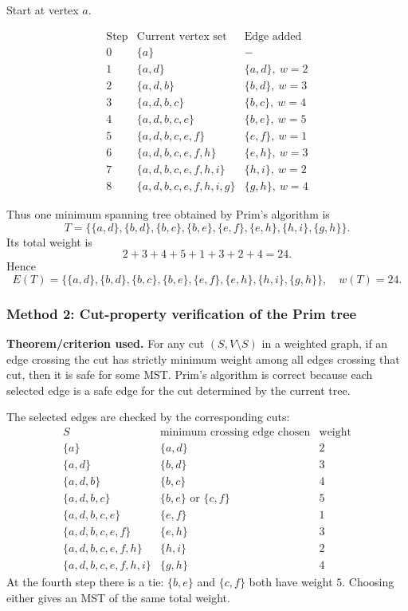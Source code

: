 \documentclass[12pt]{article}
\begin{document}
Start at vertex $a$.

\[
\begin{array}{c|c|c}
\text{Step} & \text{Current vertex set} & \text{Edge added} \\ \hline
0 & \{a\} & -\\
1 & \{a,d\} & \{a,d\},\ w=2\\
2 & \{a,d,b\} & \{b,d\},\ w=3\\
3 & \{a,d,b,c\} & \{b,c\},\ w=4\\
4 & \{a,d,b,c,e\} & \{b,e\},\ w=5\\
5 & \{a,d,b,c,e,f\} & \{e,f\},\ w=1\\
6 & \{a,d,b,c,e,f,h\} & \{e,h\},\ w=3\\
7 & \{a,d,b,c,e,f,h,i\} & \{h,i\},\ w=2\\
8 & \{a,d,b,c,e,f,h,i,g\} & \{g,h\},\ w=4
\end{array}
\]

Thus one minimum spanning tree obtained by Prim's algorithm is
\[
  T=\bigl\{
  \{a,d\},\{b,d\},\{b,c\},\{b,e\},
  \{e,f\},\{e,h\},\{h,i\},\{g,h\}
  \bigr\}.
\]
Its total weight is
\[
  2+3+4+5+1+3+2+4=24.
\]
Hence
\[
  \boxed{
  E(T)=\{\{a,d\},\{b,d\},\{b,c\},\{b,e\},\{e,f\},\{e,h\},\{h,i\},\{g,h\}\},
  \quad w(T)=24.}
\]

\subsubsection{Method 2: Cut-property verification of the Prim tree}
\textbf{Theorem/criterion used.} For any cut $(S,V\setminus S)$ in a weighted graph, if an edge crossing the cut has strictly minimum weight among all edges crossing that cut, then it is safe for some MST. Prim's algorithm is correct because each selected edge is a safe edge for the cut determined by the current tree.

The selected edges are checked by the corresponding cuts:
\[
\begin{array}{c|c|c}
S & \text{minimum crossing edge chosen} & \text{weight}\\ \hline
\{a\} & \{a,d\} & 2\\
\{a,d\} & \{b,d\} & 3\\
\{a,d,b\} & \{b,c\} & 4\\
\{a,d,b,c\} & \{b,e\}\text{ or }\{c,f\} & 5\\
\{a,d,b,c,e\} & \{e,f\} & 1\\
\{a,d,b,c,e,f\} & \{e,h\} & 3\\
\{a,d,b,c,e,f,h\} & \{h,i\} & 2\\
\{a,d,b,c,e,f,h,i\} & \{g,h\} & 4
\end{array}
\]
At the fourth step there is a tie: $\{b,e\}$ and $\{c,f\}$ both have weight $5$. Choosing either gives an MST of the same total weight.
\end{document}
